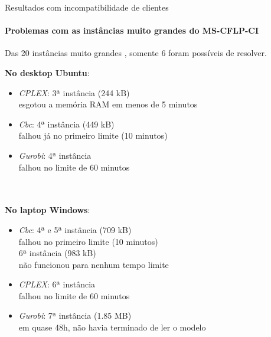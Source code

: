 \documentclass[aspectratio=169]{beamer}
\newcommand{ \solver }[1]{\textit{#1}}
\begin{document}
	\begin{frame}{Resultados com incompatibilidade de clientes} %
		\framesubtitle{Problemas com as instâncias muito grandes do MS-CFLP-CI} 
		
		Das 20 instâncias muito grandes \cite{Maia}, somente 6 foram possíveis de resolver.
		
		\begin{multicols}{2}
		
			\textbf{No desktop Ubuntu}:
			\begin{itemize}
				
				\item 
					\solver{CPLEX}: 
					3ª instância (244 kB)
					\\ esgotou a memória RAM em menos de 5 minutos  
				
				\item 	
					\solver{Cbc}: 
					4ª instância (449 kB)
					\\ falhou já no primeiro limite (10 minutos)
					
				\item	
					\solver{Gurobi}: 
					4ª instância
					\\ falhou no limite de 60 minutos
				
			\end{itemize}
		
			\hfill \\ \hfill \\
			\textbf{No laptop Windows}:				
			
			\begin{itemize}
				
				\item 	
					\solver{Cbc}: 
					4ª e 5ª instância (709 kB)
					\\ falhou no primeiro limite (10 minutos)
					\\ 6ª instância (983 kB) 
					\\ não funcionou para nenhum tempo limite
				
				\item 
					\solver{CPLEX}: 
					6ª instância
					\\ falhou no limite de 60 minutos  
				
				\item	
					\solver{Gurobi}: 
					7ª instância (1.85 MB)
					\\ em quase 48h, não havia terminado de ler o modelo 
				
			\end{itemize}
		 
		\end{multicols}
		
		
		
		
	\end{frame}	
\end{document}
